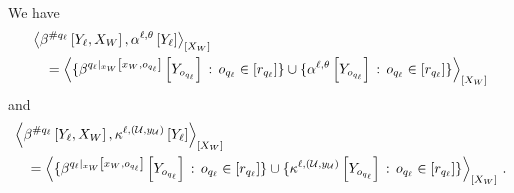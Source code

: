 \begin{lemma}
    We have
    \begin{align*}
        &\contractionof{\bencodingofat{\countquantifier\enumfolformula}{\headvariableof{\selindex},\worldvariables},\softactlegwith}{\worldvariables} \\
        &\quad = \contractionof{
            \{\bencodingofat{\groundingofat{\enumfolformula}{\worldindices,\indindexof{\enumfolformula}}}{\headvariableof{\indindexof{\enumfolformula}}} \wcols \indindexofin{\enumfolformula}\}
            \cup
            \{\softactlegat{\headvariableof{\indindexof{\enumfolformula}}} \wcols \indindexofin{\enumfolformula}\}
        }{\worldvariables}
    \end{align*}
    and
    \begin{align*}
        &\contractionof{\bencodingofat{\countquantifier\enumfolformula}{\headvariableof{\selindex},\worldvariables},\kcoreofat{\selindex,\hardparam}{\headvariableof{\selindex}}}{\worldvariables} \\
        &\quad = \contractionof{
            \{\bencodingofat{\groundingofat{\enumfolformula}{\worldindices,\indindexof{\enumfolformula}}}{\headvariableof{\indindexof{\enumfolformula}}} \wcols \indindexofin{\enumfolformula}\}
            \cup
            \{\kcoreofat{\selindex,\hardparam}{\headvariableof{\indindexof{\enumfolformula}}} \wcols \indindexofin{\enumfolformula}\}
        }{\worldvariables} \, .
    \end{align*}
\end{lemma}
